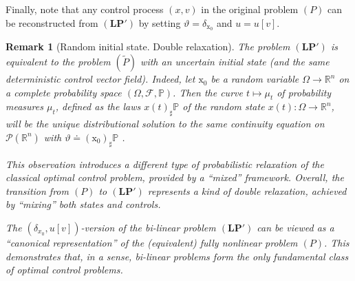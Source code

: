 \documentclass[sn-mathphys-num]{sn-jnl}
\numberwithin{equation}{section}
\theoremstyle{mythm}
\theoremstyle{mydef}
\newtheorem{remark}[proposition]{Remark}
\renewcommand{\mathbf}[1]{\bm{#1}}
\newcommand{\R}{\mathbb{R}}
\begin{document}
Finally, note that any control process \((x, v)\) in the original problem \( (P) \) can be reconstructed from \((\bm{LP}')\) by setting \( \vartheta = \delta_{\mathrm{x_0}} \) and \( u = u[v] \).


\begin{remark}[Random initial state. Double relaxation]
The problem $(\bm{LP}')$ is equivalent to the problem $(\widetilde{P})$ with an uncertain initial state (and the same deterministic control vector field). Indeed, let $\mathrm x_0$ be a random variable $ \Omega \to \R^n$ on a complete probability space $(\Omega, \mathcal F, \mathbb P)$. Then the curve $t \mapsto \mu_t$ of probability measures $\mu_t$, defined as the laws $x(t)_\sharp\mathbb P$ of the random state $x(t)\colon \Omega \to \R^n$, will be the unique distributional solution to the same continuity equation on $\mathcal P(\R^n)$ with $\vartheta \doteq (\mathrm x_0)_\sharp \mathbb P$ \cite{cavagnariLagrangianApproachTotally2023}.

This observation introduces a different type of probabilistic relaxation of the classical optimal control problem, provided by a ``mixed'' framework. Overall, the transition from \((P)\) to \((\bm{LP}')\) represents a kind of double relaxation, achieved by ``mixing'' both states and controls. 

The \((\delta_{x_0}, u[v])\)-version of the bi-linear problem \((\mathbf{LP}')\) can be viewed as a ``canonical representation'' of the (equivalent) fully nonlinear problem \((P)\). This demonstrates that, in a sense, bi-linear problems form the only fundamental class of optimal control problems.
 



\end{remark}
\end{document}

